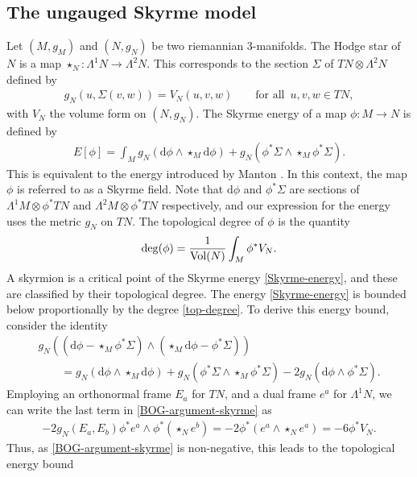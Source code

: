 \documentclass[10pt,a4paper]{amsart}
\newcommand{\1}{{\mathbb{1}}}
\def \d{\mathrm{d}}
\numberwithin{equation}{section}
\begin{document}
\subsection{The ungauged Skyrme model}
Let $(M,g_M)$ and $(N,g_N)$ be two riemannian 3-manifolds. The Hodge star of $N$ is a map $\star_{N}\colon \Lambda^1N\to\Lambda^2N$. This corresponds to the section $\Sigma$ of $TN\otimes\Lambda^2N$ defined by
\begin{align}\label{Hodge-star-def}
 g_N(u,\Sigma(v,w))=V_N(u,v,w) \qquad\text{for all }\,u,v,w\in TN,
\end{align}
with $V_N$ the volume form on $(N,g_N)$. The Skyrme energy of a map $\phi\colon M\to N$ is defined by
\begin{align}\label{Skyrme-energy}
E[\phi]=\int_Mg_N(\d\phi\wedge\star_{M} \d\phi) + g_N(\phi^\ast\Sigma\wedge\star_{M}\phi^\ast\Sigma).
\end{align}
This is equivalent to the energy introduced by Manton \cite{Manton1987geometry}. In this context, the map $\phi$ is referred to as a Skyrme field. Note that $\d\phi$ and $\phi^\ast\Sigma$ are sections of $\Lambda^1 M\otimes \phi^\ast TN$ and $\Lambda^2 M\otimes \phi^\ast TN$ respectively, and our expression for the energy uses the metric $g_N$ on $TN$. The topological degree of $\phi$ is the quantity
\begin{align}\label{top-degree}
 \deg(\phi)=\frac{1}{{\rm Vol}(N)}\int_M\phi^\ast V_N.
\end{align}
A skyrmion is a critical point of the Skyrme energy \eqref{Skyrme-energy}, and these are classified by their topological degree. The energy \eqref{Skyrme-energy} is bounded below proportionally by the degree \eqref{top-degree}. To derive this energy bound, consider the identity
\begin{gather}
g_N ((\d\phi-\star_{M}\phi^\ast\Sigma)\wedge(\star_{M} \d\phi-\phi^\ast\Sigma) )\nonumber\\
\qquad{} =g_N(\d\phi\wedge\star_{M} \d\phi) + g_N(\phi^\ast\Sigma\wedge\star_{M}\phi^\ast\Sigma) - 2g_N(\d\phi\wedge\phi^\ast\Sigma).\label{BOG-argument-skyrme}
\end{gather}
Employing an orthonormal frame $E_a$ for $TN$, and a dual frame $e^a$ for $\Lambda^1N$, we can write the last term in \eqref{BOG-argument-skyrme} as
\begin{align}\label{ip-volume-pullback}
-2g_N(E_a,E_b)\phi^\ast e^a \wedge\phi^\ast(\star_{N} e^b)=-2\phi^\ast (e^a\wedge\star_{N} e^a)=-6\phi^\ast V_N.
\end{align}
Thus, as \eqref{BOG-argument-skyrme} is non-negative, this leads to the topological energy bound
\end{document}
